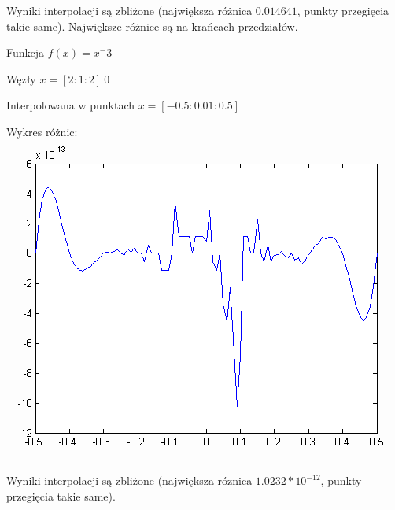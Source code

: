 \documentclass[a4paper,11pt,notitlepage]{article}
\begin{document}
Wyniki interpolacji są zbliżone (największa różnica $0.014641$, punkty przegięcia takie same). Największe różnice są na krańcach przedziałów.

Funkcja $f(x) = x^-3$

Węzły $x = [2:1:2] \ 0$

Interpolowana w punktach $x = [-0.5:0.01:0.5]$

Wykres różnic:\\
\includegraphics{spline5.png}

Wyniki interpolacji są zbliżone (największa róznica $1.0232 * 10^{-12}$, punkty przegięcia takie same).
\end{document}
